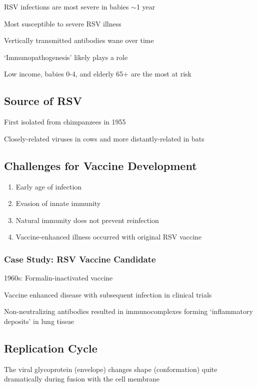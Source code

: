 \documentclass{notes}
\begin{document}
RSV infections are most severe in babies \(\sim\)1 year

\tab Most susceptible to severe RSV illness

Vertically transmitted antibodies wane over time

\tab `Immunopathogenesis' likely plays a role

Low income, babies 0-4, and elderly 65+ are the most at risk

\subsection{Source of RSV}

First isolated from chimpanzees in 1955

Closely-related viruses in cows and more distantly-related in bats

\subsection{Challenges for Vaccine Development}

\begin{enumerate}
    \item Early age of infection
    \item Evasion of innate immunity
    \item Natural immunity does not prevent reinfection
    \item Vaccine-enhanced illness occurred with original RSV vaccine
\end{enumerate}

\subsubsection{Case Study: RSV Vaccine Candidate}

1960s: Formalin-inactivated vaccine

\tab Vaccine enhanced disease with subsequent infection in clinical trials

\tab Non-neutralizing antibodies resulted in immunocomplexes forming `inflammatory deposits' in lung tissue

\subsection{Replication Cycle}


The viral glycoprotein (envelope) changes shape (conformation) quite dramatically during fusion with the cell membrane
\end{document}
